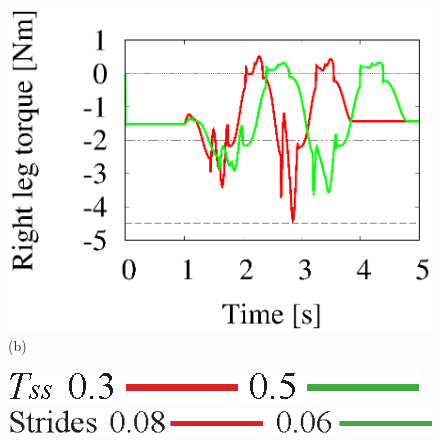 \documentclass[twocolumn]{jsarticle}
\begin{document}
\begin{figure}[h]
\begin{minipage}{0.49\linewidth}
    \includegraphics[width=1.0\linewidth]{./fig/TDS.eps}
     \footnotesize{\hspace{30pt}(b)}
  \end{minipage}
   \begin{minipage}{0.1\hsize}
        \hspace{0.02mm}
      \end{minipage}
   \begin{minipage}{0.28\linewidth}
     \centering
    \includegraphics[width=1.0\linewidth]{./fig/keyV1.eps}
  \end{minipage}
   \begin{minipage}{0.1\hsize}
        \hspace{0.02mm}
      \end{minipage}
  \begin{minipage}{0.33\linewidth}
    \centering
    \includegraphics[width=1.0\linewidth]{./fig/keyV3.eps}
  \end{minipage}
   \begin{minipage}{0.001\hsize}
        \hspace{0.02mm}
      \end{minipage}
   \begin{minipage}{0.49\linewidth}
    \centering

\end{minipage}
\end{figure}
\end{document}
